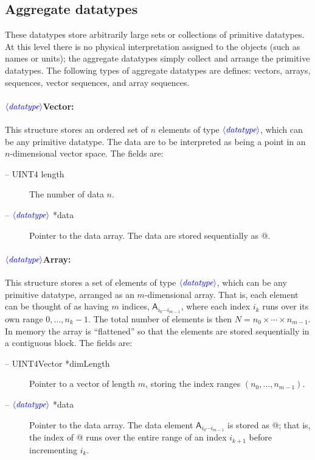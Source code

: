 \documentclass[10pt]{ligodcc}
\renewcommand{\texttt}[1]{{\ttfamily\color{blue}#1}}
\newcommand{\opt}[1]{\ensuremath{\color{blue}\langle\textit{#1}\rangle}}
\begin{document}
\subsection{Aggregate datatypes}
\label{ss:aggregate-datatypes}

These datatypes store arbitrarily large sets or collections of
primitive datatypes.  At this level there is no physical
interpretation assigned to the objects (such as names or units); the
aggregate datatypes simply collect and arrange the primitive
datatypes.  The following types of aggregate datatypes are defines:
vectors, arrays, sequences, vector sequences, and array sequences.

\paragraph{\opt{datatype}\texttt{Vector}:}
This structure stores an ordered set of $n$ elements of type
\opt{datatype}, which can be any primitive datatype.  The
data are to be interpreted as being a point in an $n$-dimensional vector space.
The fields are:
\begin{description}
\item[-- \texttt{UINT4 length}] The number of data $n$.
\item[-- \opt{datatype} \texttt{*data}] Pointer to the data array.  The data
are stored sequentially as @.
\end{description}

\paragraph{\opt{datatype}\texttt{Array}:}
This structure stores a set of elements of type \opt{datatype},
which can be any primitive datatype, arranged as an $m$-dimensional
array.  That is, each element can be thought of as having $m$
indices, $\mathsf{A}_{i_0\cdots i_{m-1}}$, where each index $i_k$
runs over its own range $0,\ldots,n_k-1$.  The total number of
elements is then $N=n_0\times\cdots\times n_{m-1}$.  In memory the
array is ``flattened'' so that the elements are stored sequentially in
a contiguous block.  The fields are:
\begin{description}
\item[-- \texttt{UINT4Vector *dimLength}] Pointer to a vector of length
$m$, storing the index ranges $(n_0,\ldots,n_{m-1})$.
\item[-- \opt{datatype} \texttt{*data}] Pointer to the data array.  The data
element $\mathsf{A}_{i_0\cdots i_{m-1}}$ is stored as
@; that is,
the index of \verb@data[]@ runs over the entire range of an index
$i_{k+1}$ before incrementing $i_k$.
\end{description}
\end{document}
